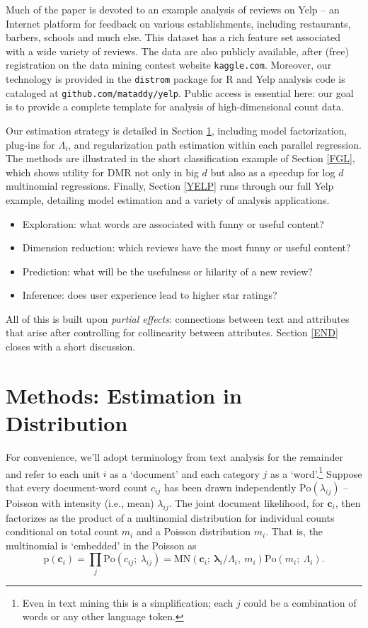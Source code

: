 \documentclass[12pt]{article}
\newcommand{\sgl}{\setstretch{1.1}}
\newcommand{\bs}[1]{\boldsymbol{#1}}
\newcommand{\mr}[1]{\mathrm{#1}}
\newcommand{\bm}[1]{\mathbf{#1}}
\newcommand{\cd}[1]{{\tt#1}}
\begin{document}
Much of the paper is devoted to an example analysis of reviews on Yelp -- an
Internet platform for feedback on various establishments, including
restaurants, barbers, schools and much else.  This dataset has a rich feature
set associated with a wide variety of reviews. The data are also publicly
available, after (free) registration on the data mining contest website
\cd{kaggle.com}. 
Moreover, our technology is provided in the \cd{distrom} package for R and
 Yelp analysis code is cataloged at \cd{github.com/mataddy/yelp}.  Public
access is essential here: our goal is to provide a
complete template for analysis of high-dimensional count data.

Our estimation strategy is detailed in Section \ref{methods}, including model
factorization, plug-ins for $\Lambda_i$, and regularization
path estimation within each parallel regression. The methods
are illustrated in the short classification example of Section
\ref{FGL}, which shows utility for DMR not only in
big $d$ but also as a speedup for log $d$ multinomial regressions. Finally,
Section \ref{YELP} runs through our full Yelp example, detailing model
estimation and a variety of analysis applications.
\begin{itemize}\sgl
\item 
Exploration: what words are associated with funny or useful content?
\item Dimension reduction: which reviews have the most funny or useful content?
\item Prediction: what will be the usefulness or hilarity of a new review? 
\item Inference: does user experience lead to higher star ratings?
\end{itemize}
All of this is built upon {\it partial effects}:  connections
between text and attributes that arise  after controlling for
collinearity between attributes.  Section \ref{END} closes with a short
discussion.


\section{Methods: Estimation in Distribution}
\label{methods}

For convenience, we'll adopt terminology from text analysis for the remainder
and refer to each unit $i$ as a `document' and each category $j$ as a
`word'.\footnote{Even in text mining this is a simplification; each $j$ could
be a combination of words or any other language token.} Suppose that every
document-word count $c_{ij}$ has been drawn independently
$\mr{Po}\left(\lambda_{ij}\right)$ -- Poisson with intensity (i.e., mean)
$\lambda_{ij}$. The joint document likelihood, for $\bm{c}_i$, then factorizes as the
product of a multinomial distribution for  individual counts conditional on
 total count $m_i$ and a Poisson distribution $m_i$.
That is, the multinomial is `embedded' in the Poisson as
\begin{equation}\label{embed} \mr{p}(\bm{c}_{i}) = \prod_j
\mr{Po}\left(c_{ij};~\lambda_{ij}\right) =
\mr{MN}\left(\bm{c}_i;~\bs{\lambda}_{i}/\Lambda_i,
~m_i\right)\mr{Po}\left(m_i;~\Lambda_i\right). 
\end{equation}
\end{document}
